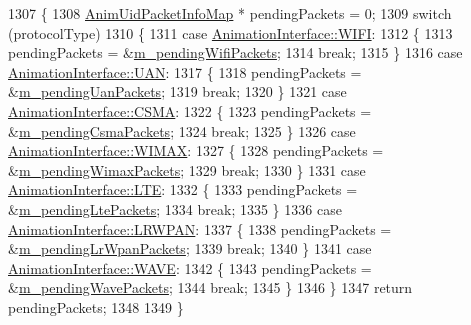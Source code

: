 \begin{DoxyCode}
1307 \{
1308   \hyperlink{classns3_1_1AnimationInterface_afea577896009c4134df836bc20f1eabe}{AnimUidPacketInfoMap} * pendingPackets = 0;
1309   \textcolor{keywordflow}{switch} (protocolType)
1310     \{
1311       \textcolor{keywordflow}{case} \hyperlink{classns3_1_1AnimationInterface_a801a4efd553ff0d1d768cd70d22456b6afc37c88b12f1b26ee565dac2536d0bb5}{AnimationInterface::WIFI}:
1312         \{
1313           pendingPackets = &\hyperlink{classns3_1_1AnimationInterface_a9ef0e9ce4273ba81324813f79a069003}{m\_pendingWifiPackets};
1314           \textcolor{keywordflow}{break};
1315         \}
1316       \textcolor{keywordflow}{case} \hyperlink{classns3_1_1AnimationInterface_a801a4efd553ff0d1d768cd70d22456b6a930e85d5c281228df80c06e2aa921e2c}{AnimationInterface::UAN}:
1317         \{
1318           pendingPackets = &\hyperlink{classns3_1_1AnimationInterface_a5630debe0e6c9a2421a311a6ebe8d396}{m\_pendingUanPackets};
1319           \textcolor{keywordflow}{break};
1320         \}
1321       \textcolor{keywordflow}{case} \hyperlink{classns3_1_1AnimationInterface_a801a4efd553ff0d1d768cd70d22456b6a5fb0f9f61327638f165213b90492cfa7}{AnimationInterface::CSMA}:
1322         \{
1323           pendingPackets = &\hyperlink{classns3_1_1AnimationInterface_ae80a577d450396d34df2499ec2c3c6ec}{m\_pendingCsmaPackets};
1324           \textcolor{keywordflow}{break};
1325         \}
1326       \textcolor{keywordflow}{case} \hyperlink{classns3_1_1AnimationInterface_a801a4efd553ff0d1d768cd70d22456b6a1efe3945a884415af2a55f40b35848cd}{AnimationInterface::WIMAX}:
1327         \{
1328           pendingPackets = &\hyperlink{classns3_1_1AnimationInterface_a4ab6c7854d9fb170f89b8102b6639ea9}{m\_pendingWimaxPackets};
1329           \textcolor{keywordflow}{break};
1330         \}
1331       \textcolor{keywordflow}{case} \hyperlink{classns3_1_1AnimationInterface_a801a4efd553ff0d1d768cd70d22456b6a8a686aad98ab0f637f9e8ff674672d0a}{AnimationInterface::LTE}:
1332         \{
1333           pendingPackets = &\hyperlink{classns3_1_1AnimationInterface_abc07805734a4f250a8c791730cdffd67}{m\_pendingLtePackets};
1334           \textcolor{keywordflow}{break};
1335         \}
1336       \textcolor{keywordflow}{case} \hyperlink{classns3_1_1AnimationInterface_a801a4efd553ff0d1d768cd70d22456b6a6356c745a7c48e2f8789f87a4f90da89}{AnimationInterface::LRWPAN}:
1337         \{
1338           pendingPackets = &\hyperlink{classns3_1_1AnimationInterface_aa5fe4fe78cfa8cd3da785292a4a18b71}{m\_pendingLrWpanPackets};
1339           \textcolor{keywordflow}{break};
1340         \}
1341       \textcolor{keywordflow}{case} \hyperlink{classns3_1_1AnimationInterface_a801a4efd553ff0d1d768cd70d22456b6a090868db2e88c7d4d576d145ef25ab93}{AnimationInterface::WAVE}:
1342         \{
1343           pendingPackets = &\hyperlink{classns3_1_1AnimationInterface_a19f55ec0186539c05b68cdcb45ce262d}{m\_pendingWavePackets};
1344           \textcolor{keywordflow}{break};
1345         \}
1346     \}
1347   \textcolor{keywordflow}{return} pendingPackets;
1348 
1349 \}
\end{DoxyCode}


